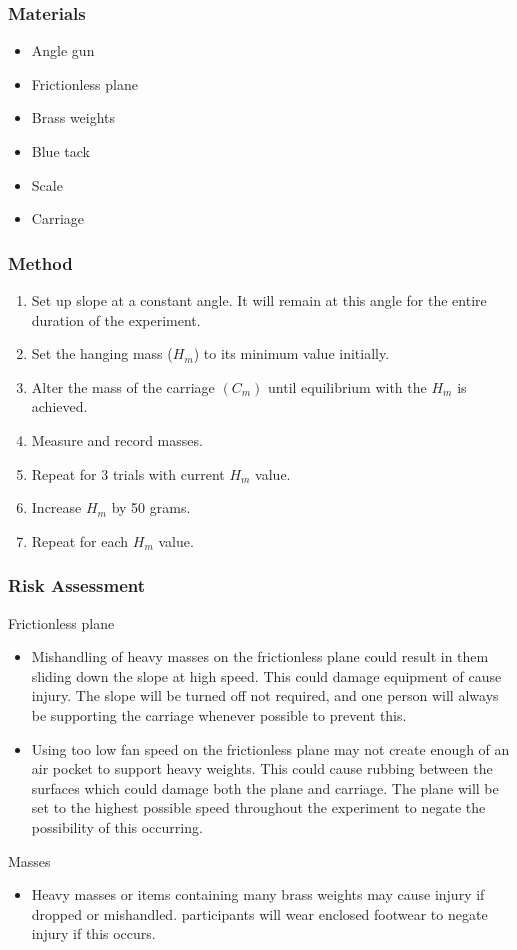 \documentclass[11pt,a4paper]{article}
\begin{document}
\subsubsection{Materials}
\begin{itemize}
	\item Angle gun 
	\item Frictionless plane
	\item Brass weights
	\item Blue tack 
	\item Scale
	\item Carriage
\end{itemize}

\subsubsection{Method}
\begin{enumerate}
\item Set up slope at a constant angle. It will remain at this angle for the entire duration of the experiment. 
\item Set the hanging mass ($H_m$) to its minimum value initially.
\item Alter the mass of the carriage $(C_m)$ until equilibrium with the $H_m$ is achieved.
\item Measure and record masses. 
\item Repeat for 3 trials with current $H_m$ value.
\item Increase $H_m$ by 50 grams. 
\item Repeat for each $H_m$ value.
\end{enumerate}


\subsubsection{Risk Assessment}
Frictionless plane
\begin{itemize}
	\item Mishandling of heavy masses on the frictionless plane could result in them sliding down the slope at high speed. This could damage equipment of cause injury. The slope will be turned off not required, and one person will always be supporting the carriage whenever possible to prevent this. 
	\item Using too low fan speed on the frictionless plane may not create enough of an air pocket to support heavy weights. This could cause rubbing between the surfaces which could damage both the plane and carriage. The plane will be set to the highest possible speed throughout the experiment to negate the possibility of this occurring.
\end{itemize}
Masses
\begin{itemize}
	\item Heavy masses or items containing many brass weights may cause injury if dropped or mishandled. participants will wear enclosed footwear to negate injury if this occurs.  
\end{itemize}
\end{document}
